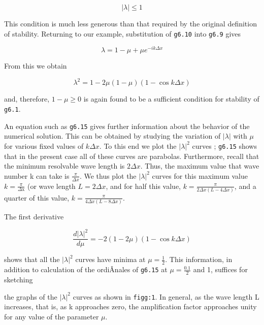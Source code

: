 {\[|\lambda| \leq 1\]}

This condition is much less generous than that required by the original
definition of stability. Returning to our example, substitution of
\texttt{g6.10} into \texttt{g6.9} gives

{\[\lambda = 1 - \mu + \mu e^{-ik\Delta x}\]}

From this we obtain

{\[\lambda^{2} =1 - 2\mu\left( 1 - \mu \right)\left( 1 - \cos{k\Delta x} \right)\]}

and, therefore, \(1 - \mu \geq 0 \) is again found to be a sufficient
condition for stability of \texttt{g6.1}.

An equation such as \texttt{g6.15} gives further information about the
behavior of the numerical solution. This can be obtained by studying the
variation of \(|\lambda|\) with \(\mu\) for various fixed values of
\(k\Delta x\). To this end we plot the \(|\lambda|^{2}\) curves ;
\texttt{g6.15} shows that in the present case all of these curves are
parabolas. Furthermore, recall that the minimum resolvable wave length
is \(2 \Delta x\). Thus, the maximum value that wave number k can take
is \(\frac{\pi}{\Delta x}\). We thus plot the \(|\lambda|^{2}\) curves
for this maximum value \(k = \frac{\pi}{\Delta\text{x}}\) (or wave
length \(L = 2\Delta x\), and for half this value,
\(k = \frac{\pi}{2\Delta x\left( L - 4\Delta x \right)}\), and a quarter
of this value,
\(k = \frac{\pi}{4\Delta x\left( L - 8\Delta x \right)}\).

The first derivative

\[\frac{d|\lambda|^2}{d\mu} = - 2( 1 - 2\mu)( 1 - \cos{k \Delta x} )\]

shows that all the \(|\lambda|^{2}\) curves have minima at
\(\mu = \frac{1}{2}\). This information, in addition to calculation of
the ordiÂ­nales of \texttt{g6.15} at \(\mu = \frac{0.1}{2}\) and 1,
suffices for sketching

\begin{figure}
\centering
{}
\caption{}
\end{figure}

the graphs of the \(\left| \lambda \right|^{2}\) curves as shown in
\texttt{figg:1}. In general, as the wave length L increases, that is, as
k approaches zero, the amplification factor approaches unity for any
value of the parameter \(\mu\).

